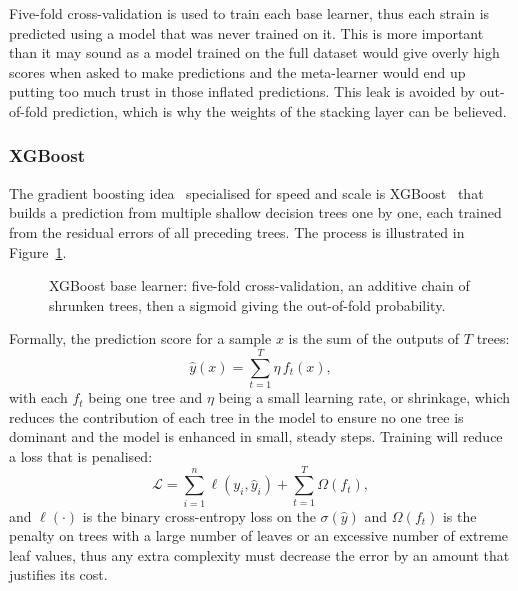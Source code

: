 Five-fold cross-validation is used to train each base learner, thus each strain is predicted
using a model that was never trained on it. This is more important than it may sound as a
model trained on the full dataset would give overly high scores when asked to make predictions
and the meta-learner would end up putting too much trust in those inflated predictions. This
leak is avoided by out-of-fold prediction, which is why the weights of the stacking layer can
be believed.

\subsubsection{XGBoost}

The gradient boosting idea~\cite{friedman2001gbm} specialised for speed and scale is
XGBoost~\cite{chen2016xgboost} that builds a prediction from multiple shallow decision trees
one by one, each trained from the residual errors of all preceding trees. The process is
illustrated in Figure~\ref{fig:xgboost-workflow}.

\begin{figure}[H]
  \centering
  \makebox[\textwidth][c]{%
    \resizebox{\textwidth}{!}{}%
  }
  \caption{XGBoost base learner: five-fold cross-validation, an additive chain of shrunken trees, then a sigmoid giving the out-of-fold probability.}
  \label{fig:xgboost-workflow}
\end{figure}

Formally, the prediction score for a sample $x$ is the sum of the outputs of $T$ trees:
\begin{equation}
\hat{y}(x) = \sum_{t=1}^{T} \eta\, f_t(x),
\label{eq:xgb_score}
\end{equation}
with each $f_t$ being one tree and $\eta$ being a small learning rate, or shrinkage, which
reduces the contribution of each tree in the model to ensure no one tree is dominant and the
model is enhanced in small, steady steps. Training will reduce a loss that is penalised:
\begin{equation}
\mathcal{L} = \sum_{i=1}^{n} \ell(y_i, \hat{y}_i) + \sum_{t=1}^{T} \Omega(f_t),
\label{eq:xgb_loss}
\end{equation}
and $\ell(\cdot)$ is the binary cross-entropy loss on the $\sigma(\hat{y})$ and $\Omega(f_t)$
is the penalty on trees with a large number of leaves or an excessive number of extreme leaf
values, thus any extra complexity must decrease the error by an amount that justifies its cost.

